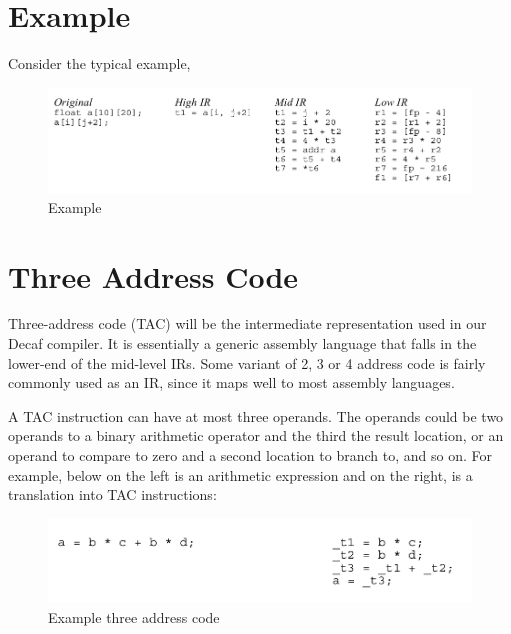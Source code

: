 \documentclass[12pt, oneside, a4paper]{article}
\begin{document}
\section{Example}
Consider the typical example,
\begin{figure}[htb]
\begin{center}
\ifpdf
	\includegraphics[scale=0.450]{./snapshot7.png}
\else
\fi
\caption{Example}
\end{center}
\end{figure}


\section{Three Address Code}
Three-address code (TAC) will be the intermediate representation used in our Decaf compiler. It is essentially a generic assembly language that falls in the lower-end of the mid-level IRs. Some variant of 2, 3 or 4 address code is fairly commonly used as an IR, since it maps well to most assembly languages.

A TAC instruction can have at most three operands. The operands could be two operands to a binary arithmetic operator and the third the result location, or an operand to compare to zero and a second location to branch to, and so on. For example, below on the left is an arithmetic expression and on the right, is a translation into TAC instructions:

\begin{figure}[htb]
\begin{center}
\ifpdf
	\includegraphics[scale=0.50]{./snapshot8.png}
\else
\fi
\caption{Example three address code}
\end{center}
\end{figure}
\end{document}
